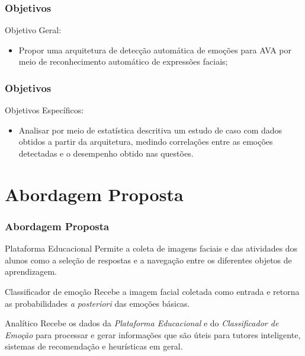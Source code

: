 \documentclass{beamer}
\begin{document}
\begin{frame}
\frametitle{Objetivos}
\begin{block}{Objetivo Geral:}
\begin{itemize}
\pause
\item Propor uma arquitetura de detec\c{c}\~ao autom\'atica de emo\c{c}\~oes para AVA por meio de reconhecimento autom\'atico de express\~oes faciais;
\end{itemize}
\end{block}


\frametitle{Objetivos}
\begin{block}{Objetivos Específicos:}
\begin{itemize}
\pause
\item Analisar por meio de estat\'istica descritiva um estudo de caso com dados obtidos a partir da arquitetura, 
medindo correla\c{c}\~oes entre as emo\c{c}\~oes detectadas e o desempenho obtido nas quest\~oes.
\end{itemize}
\end{block}
\end{frame}



\section{Abordagem Proposta}
\begin{frame}
\frametitle{Abordagem Proposta}
\pause
\begin{block}{Plataforma Educacional}
Permite a coleta de imagens faciais e das atividades dos alunos como a sele\c{c}\~ao de 
respostas e a navega\c{c}\~ao entre os diferentes objetos de aprendizagem.
\end{block}
\pause
\begin{block}{Classificador de emo\c{c}\~ao}
Recebe a imagem facial coletada como entrada e retorna as probabilidades \textit{a posteriori} das emo\c{c}\~oes b\'asicas.
\end{block}
\pause
\begin{block}{Anal\'{i}tico}
Recebe os dados da \textit{Plataforma Educacional} e do \textit{Classificador de Emo\c{c}\~ao} para processar e gerar informa\c{c}\~oes que s\~{a}o 
\'{u}teis para tutores inteligente, sistemas de recomenda\c{c}\~ao e heur\'isticas em geral.    
\end{block}

\end{frame}
\end{document}
